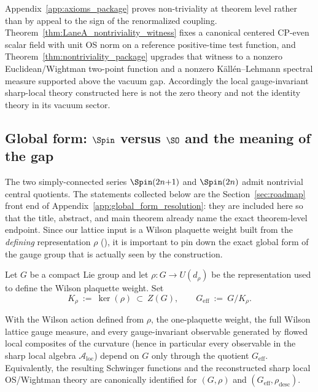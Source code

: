 \begin{remark}\label{rem:nontriviality_witness}
Appendix~\ref{app:axioms_package} proves non-triviality at theorem level rather than by appeal to the sign of the renormalized coupling.
Theorem~\ref{thm:LaneA_nontriviality_witness} fixes a canonical centered CP-even scalar field with unit OS norm on a reference positive-time test function,
and Theorem~\ref{thm:nontriviality_package} upgrades that witness to a nonzero Euclidean/Wightman two-point function and a nonzero K\"all\'en--Lehmann spectral measure supported above the vacuum gap.
Accordingly the local gauge-invariant sharp-local theory constructed here is not the zero theory and not the identity theory in its vacuum sector.
\end{remark}

\subsection{Global form: \texorpdfstring{$\Spin$}{Spin} versus \texorpdfstring{$\SO$}{SO} and the meaning of the gap}
\label{subsec:spin_vs_so}

The two simply-connected series $\Spin(2n{+}1)$ and $\Spin(2n)$ admit nontrivial central quotients.
The statements collected below are the Section~\ref{sec:roadmap} front end of Appendix~\ref{app:global_form_resolution}: they are included here so that the title, abstract, and main theorem already name the exact theorem-level endpoint.
Since our lattice input is a Wilson plaquette weight built from the \emph{defining} representation $\rho$
(), it is important to pin down the exact global form of the gauge group
that is actually seen by the construction.

\begin{definition}
\label{def:effective_group}
Let $G$ be a compact Lie group and let $\rho:G\to U(d_\rho)$ be the representation used to define the Wilson plaquette weight.
Set
\begin{equation}
\label{eq:kernel_K}
K_\rho\ :=\ \ker(\rho)\ \subset\ Z(G),
\qquad
G_{\mathrm{eff}}\ :=\ G/K_\rho.
\end{equation}
\end{definition}

\begin{lemma}
\label{lem:center_blindness_descent}
With the Wilson action defined from $\rho$, the one-plaquette weight, the full Wilson lattice gauge measure,
and every gauge-invariant observable generated by flowed local composites of the curvature (hence in particular
every observable in the sharp local algebra $\mathcal A_{\mathrm{loc}}$) depend on $G$ only through the quotient $G_{\mathrm{eff}}$.
Equivalently, the resulting Schwinger functions and the reconstructed sharp local OS/Wightman theory are canonically
identified for $(G,\rho)$ and $(G_{\mathrm{eff}},\rho_{\mathrm{desc}})$.
\end{lemma}

